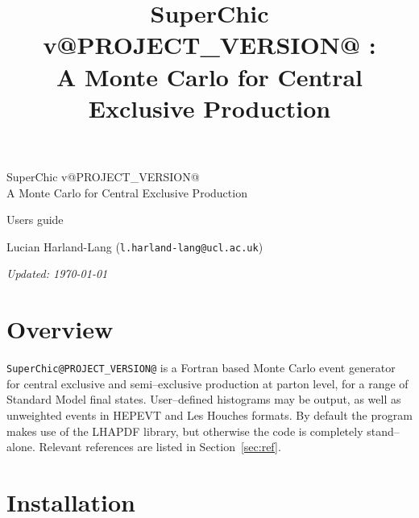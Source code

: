 \documentclass[12pt]{article}
\title{SuperChic v@PROJECT_VERSION@ : \\ \vspace{0.5cm}A Monte Carlo for Central Exclusive Production}
\begin{document}
\begin{titlepage}
\begin{center}

{\huge SuperChic v@PROJECT_VERSION@} \\ \vspace{0.5cm} {\Large A Monte Carlo for Central Exclusive Production}

\vspace{3cm}

{\huge Users guide}

\vspace{3cm}

\large{ Lucian Harland-Lang (\texttt{l.harland-lang@ucl.ac.uk})}

\vspace{3cm}
{\small \emph{Updated: \today}}

\end{center}
\end{titlepage}

\clearpage

\tableofcontents

\clearpage

\section{Overview}

\texttt{SuperChic@PROJECT_VERSION@} is a Fortran based Monte Carlo event 
generator for central exclusive and semi--exclusive production at parton 
level, for a range of Standard Model final states. User--defined 
histograms may be output, as well as unweighted events in HEPEVT and 
Les Houches formats. By default the program makes use of the LHAPDF 
library, but otherwise the code is completely stand--alone. Relevant 
references are listed in Section~\ref{sec:ref}.

\section{Installation}
\end{document}
